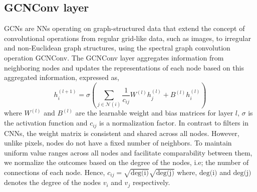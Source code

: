 \subsection{GCNConv layer}
GCNs are NNs operating on graph-structured data that extend the concept of convolutional operations from regular grid-like data, such as images, to irregular and non-Euclidean graph structures, using the spectral graph convolution operation GCNConv. The GCNConv layer aggregates information from neighboring nodes and updates the representations of each node based on this aggregated information, expressed as,
\begin{equation}
h_i^{(l+1)} = \sigma \left(\sum_{j \in \mathcal{N}(i)} \frac{1}{c_{ij}} W^{(l)} h_j^{(l)} + B^{(l)} h_i^{(l)} \right)
\end{equation}
where $W^{(l)}$ and $B^{(l)}$ are the learnable weight and bias matrices for layer $l$, $\sigma$ is the activation function and $c_{ij}$ is a normalization factor. 
In contrast to filters in CNNs, the weight matrix is consistent and shared across all nodes. However, unlike pixels, nodes do not have a fixed number of neighbors. To maintain uniform value ranges across all nodes and facilitate comparability between them, we normalize the outcomes based on the degree of the nodes, i.e; the number of connections of each node. Hence, $c_{ij} = \sqrt{\text{deg(i)}}\sqrt{\text{deg(j)}}$ where, $\text{deg(i)}$ and $\text{deg(j)}$ denotes the degree of the nodes $v_i$ and $v_j$ respectively. 

